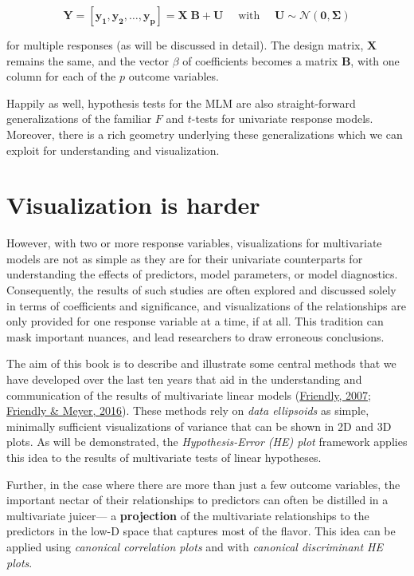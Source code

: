 \documentclass[
  letterpaper,
  10pt,
  krantz2]{krantz}
\begin{document}
\[\mathbf{Y} = [\mathbf{y_1}, \mathbf{y_2}, \dots, \mathbf{y_p}] = \mathbf{X} \; \mathbf{B} + \mathbf{U} \quad\mbox{   with   }\quad \mathbf{U} \sim \mathcal{N} (\mathbf{0}, \mathbf{\Sigma})\]

for multiple responses (as will be discussed in detail). The design
matrix, \(\mathbf{X}\) remains the same, and the vector \(\beta\) of
coefficients becomes a matrix \(\mathbf{B}\), with one column for each
of the \(p\) outcome variables.

Happily as well, hypothesis tests for the MLM are also straight-forward
generalizations of the familiar \(F\) and \(t\)-tests for univariate
response models. Moreover, there is a rich geometry underlying these
generalizations which we can exploit for understanding and
visualization.

\hypertarget{visualization-is-harder}{%
\section{Visualization is harder}\label{visualization-is-harder}}

However, with two or more response variables, visualizations for
multivariate models are not as simple as they are for their univariate
counterparts for understanding the effects of predictors, model
parameters, or model diagnostics. Consequently, the results of such
studies are often explored and discussed solely in terms of coefficients
and significance, and visualizations of the relationships are only
provided for one response variable at a time, if at all. This tradition
can mask important nuances, and lead researchers to draw erroneous
conclusions.

The aim of this book is to describe and illustrate some central methods
that we have developed over the last ten years that aid in the
understanding and communication of the results of multivariate linear
models (\protect\hyperlink{ref-Friendly-07-manova}{Friendly, 2007};
\protect\hyperlink{ref-FriendlyMeyer:2016:DDAR}{Friendly \& Meyer,
2016}). These methods rely on \emph{data ellipsoids} as simple,
minimally sufficient visualizations of variance that can be shown in 2D
and 3D plots. As will be demonstrated, the \emph{Hypothesis-Error (HE)
plot} framework applies this idea to the results of multivariate tests
of linear hypotheses.

Further, in the case where there are more than just a few outcome
variables, the important nectar of their relationships to predictors can
often be distilled in a multivariate juicer--- a \textbf{projection} of
the multivariate relationships to the predictors in the low-D space that
captures most of the flavor. This idea can be applied using
\emph{canonical correlation plots} and with \emph{canonical discriminant
HE plots}.
\end{document}
